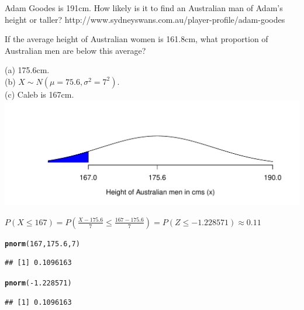 \documentclass[bigtut]{tutorial}\usepackage[]{graphicx}\usepackage[]{color}
\makeatletter
\def\maxwidth{ %
  \ifdim\Gin@nat@width>\linewidth
    \linewidth
  \else
    \Gin@nat@width
  \fi
}
\newcommand{\hlnum}[1]{\textcolor[rgb]{0.686,0.059,0.569}{#1}}%
\newcommand{\hlopt}[1]{\textcolor[rgb]{0,0,0}{#1}}%
\newcommand{\hlstd}[1]{\textcolor[rgb]{0.345,0.345,0.345}{#1}}%
\newcommand{\hlkwd}[1]{\textcolor[rgb]{0.737,0.353,0.396}{\textbf{#1}}}%
\newenvironment{kframe}{%
 \def\at@end@of@kframe{}%
 \ifinner\ifhmode%
  \def\at@end@of@kframe{\end{minipage}}%
  \begin{minipage}{\columnwidth}%
 \fi\fi%
 \def\FrameCommand##1{\hskip\@totalleftmargin \hskip-\fboxsep
 \colorbox{shadecolor}{##1}\hskip-\fboxsep
     \hskip-\linewidth \hskip-\@totalleftmargin \hskip\columnwidth}%
 \MakeFramed {\advance\hsize-\width
   \@totalleftmargin\z@ \linewidth\hsize
   \@setminipage}}%
 {\par\unskip\endMakeFramed%
 \at@end@of@kframe}
\newenvironment{knitrout}{}{} %
\makeatother
\begin{document}
\begin{tutorial}
\begin{questions}
\begin{parts}
\vspace{.5cm}
\item  Adam Goodes is 191cm. How likely is it to find an Australian man of Adam's height or taller?
{\tiny http://www.sydneyswans.com.au/player-profile/adam-goodes}

\vspace{.5cm}
\item If the average height of Australian women is 161.8cm, what proportion of Australian men are below this average?

\end{parts}


\begin{solution}
(a) 175.6cm. \\

(b) $X \sim N(\mu = 75.6, \sigma^2 = 7^2)$. \\

(c) Caleb is 167cm. \\

\begin{knitrout}
\color{fgcolor}
\includegraphics[width=\maxwidth]{figure/unnamed-chunk-3-1} 

\end{knitrout}

$P(X \leq 167) = P(\frac{X-175.6}{7} \leq \frac{167-175.6}{7} ) = P(Z \leq -1.228571) \approx 0.11$

\begin{knitrout}
\color{fgcolor}\begin{kframe}
\begin{alltt}
\hlkwd{pnorm}\hlstd{(}\hlnum{167}\hlstd{,}\hlnum{175.6}\hlstd{,}\hlnum{7}\hlstd{)}
\end{alltt}
\begin{verbatim}
## [1] 0.1096163
\end{verbatim}
\begin{alltt}
\hlkwd{pnorm}\hlstd{(}\hlopt{-}\hlnum{1.228571}\hlstd{)}
\end{alltt}
\begin{verbatim}
## [1] 0.1096163
\end{verbatim}
\end{kframe}
\end{knitrout}


\end{solution}
\end{questions}
\end{tutorial}
\end{document}
